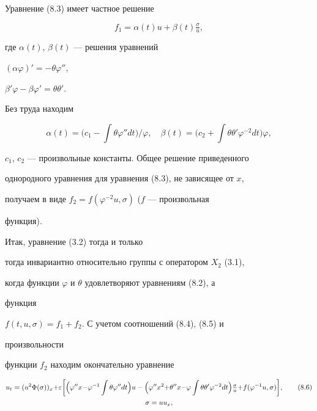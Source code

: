 Уравнение (8.3) имеет частное решение 


\begin{equation} 


f_1=\alpha(t)u+\beta(t)\tfrac{\sigma}{u}, \tag{8.4} 


\end{equation} 


где $\alpha(t)$, $\beta(t)$ --- решения уравнений 


$(\alpha\varphi)'=-\theta\varphi''$, 


$\beta'\varphi-\beta\varphi'=\theta\theta'$. 


Без труда находим 


\begin{equation} 


\alpha(t)=\Big(c_1-\int\theta\varphi''dt\Big)/\varphi,\quad 


\beta(t)=\Big(c_2+\int\theta\theta'\varphi^{-2}dt\Big)\varphi, 


\tag{8.5} 


\end{equation} 


$c_1$, $c_2$ --- произвольные константы. Общее решение приведенного 


однородного уравнения для уравнения (8.3), не зависящее от $x$, 


получаем в виде $f_2=f(\varphi^{-2}u,\sigma)$ ($f$ --- произвольная 


функция). 


 


Итак, уравнение (3.2) тогда и только 


тогда инвариантно относительно группы с оператором $X_2$ (3.1), 


когда функции $\varphi$ и $\theta$ удовлетворяют уравнениям (8.2), а 


функция 


$f(t,u,\sigma)=f_1+f_2$. С учетом соотношений (8.4), (8.5) и 


произвольности 


функции $f_2$ находим окончательно уравнение 


\begin{gather} 


u_t=(u^2\Phi(\sigma))_x{+}\varepsilon\bigg[\Big(\varphi''x{-} 


\varphi^{-1}\int\theta\varphi''dt\Big)u- 


\Big(\varphi''x^2{+}\theta''x{-}\varphi\int\theta\theta' 


\varphi^{-2}dt\Big)\tfrac{\sigma}{u}{+} 


f(\varphi^{-1}u,\sigma)\bigg],\tag{8.6} \\ 


% 


\sigma=u u_x,\notag 


\end{gather} 


